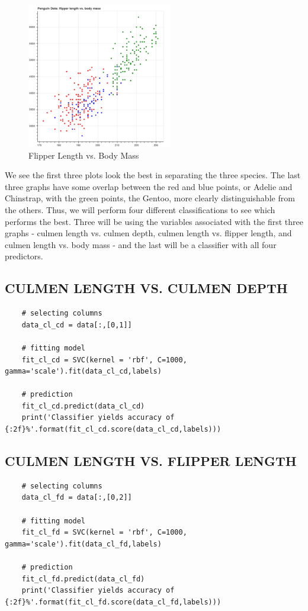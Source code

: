 \documentclass[12pt]{article}
\begin{document}
\begin{figure}[H]
    \centering
    \includegraphics[width=2.5in]{Figures/penguins/fl_bm.png}
    \caption{Flipper Length vs. Body Mass}
    \label{fig_fl_bm}
\end{figure}

We see the first three plots look the best in separating the three species. The last three graphs have some overlap between the red and blue points, or Adelie and Chinstrap, with the green points, the Gentoo, more clearly distinguishable from the others. Thus, we will perform four different classifications to see which performs the best. Three will be using the variables associated with the first three graphs - culmen length vs. culmen depth, culmen length vs. flipper length, and culmen length vs. body mass - and the last will be a classifier with all four predictors.

\subsection{CULMEN LENGTH VS. CULMEN DEPTH}

\begin{verbatim}
    # selecting columns
    data_cl_cd = data[:,[0,1]]

    # fitting model
    fit_cl_cd = SVC(kernel = 'rbf', C=1000, gamma='scale').fit(data_cl_cd,labels)

    # prediction
    fit_cl_cd.predict(data_cl_cd)
    print('Classifier yields accuracy of {:2f}%'.format(fit_cl_cd.score(data_cl_cd,labels)))    
\end{verbatim}

\subsection{CULMEN LENGTH VS. FLIPPER LENGTH}

\begin{verbatim}
    # selecting columns
    data_cl_fd = data[:,[0,2]]

    # fitting model
    fit_cl_fd = SVC(kernel = 'rbf', C=1000, gamma='scale').fit(data_cl_fd,labels)

    # prediction
    fit_cl_fd.predict(data_cl_fd)
    print('Classifier yields accuracy of {:2f}%'.format(fit_cl_fd.score(data_cl_fd,labels)))  
\end{verbatim}
\end{document}
